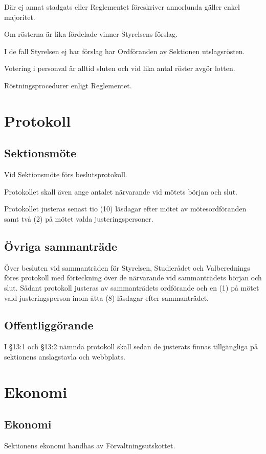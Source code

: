 \documentclass[10pt]{article}
\begin{document}
Där ej annat stadgats eller Reglementet föreskriver annorlunda gäller enkel
majoritet.

Om rösterna är lika fördelade vinner Styrelsens förslag.

I de fall Styrelsen ej har förslag har Ordföranden av Sektionen utslagsrösten.

Votering i personval är alltid sluten och vid lika antal röster avgör lotten.

Röstningsprocedurer enligt Reglementet.
\newpage

\section{Protokoll}
\subsection{Sektionsmöte}
Vid Sektionsmöte förs beslutsprotokoll.

Protokollet skall även ange antalet närvarande vid mötets början och slut.

Protokollet justeras senast tio (10) läsdagar efter mötet av
mötesordföranden samt två (2) på mötet valda justeringspersoner.

\subsection{Övriga sammanträde}
Över besluten vid sammanträden för Styrelsen, Studierådet och
Valberednings föres protokoll med förteckning över de närvarande vid
sammanträdets början och slut.
Sådant protokoll justeras av sammanträdets ordförande och en (1) på mötet
vald justeringsperson inom åtta (8) läsdagar efter sammanträdet.

\subsection{Offentliggörande}
I §13:1 och §13:2 nämnda protokoll skall sedan de justerats finnas
tillgängliga på sektionens anslagstavla och webbplats.
\newpage

\section{Ekonomi}
\subsection{Ekonomi}
Sektionens ekonomi handhas av Förvaltningsutskottet.
\end{document}
